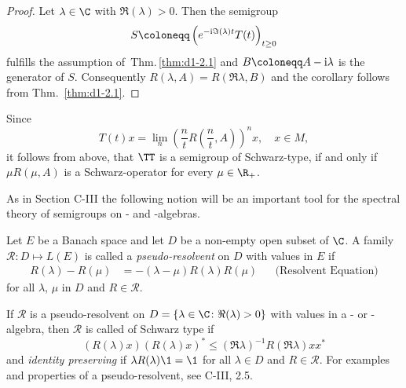 \begin{proof}
Let $ \lambda \in \C $ with $ \Re(\lambda) > 0 $.
Then the semigroup
\[
S \coloneqq \left(e^{- \I \Im (\lambda) t }T(t) \right)_{t \geq 0}
\]
fulfills the assumption of{\ }Thm.\,\ref{thm:d1-2.1} and $ B \coloneqq A - \I \lambda $ is the generator of $ S $.
Consequently $ R(\lambda,A) = R(\Re\lambda,B) $ and the corollary follows from Thm.~\ref{thm:d1-2.1}.
\end{proof}
\begin{remark}\label{rem:d1-2.3}
Since 
%
\[
	T(t)x = \lim_{n} \left( \frac{n}{t} R\left(\frac{n}{t}, A\right) \right)^{n} x , \quad x \in M , 
\]
%
it follows from above, that $ \TT $ is a semigroup of Schwarz-type, if and only if $ \mu R( \mu, A) $ is a Schwarz-operator for every $ \mu \in \R_{+} $.
\end{remark}
As in Section C-III the following notion will be an important tool for the spectral theory of semigroups on \CA- and \WA-algebras.
\begin{definition}\label{def:d1-2.4}
Let $E$ be a Banach space and let $D$ be a non-empty open subset of $\C$.
A family $ \mathcal{R} \colon D \mapsto L(E) $ is called a \emph{pseudo-resolvent} on $ D $ with values in $ E $ if
\begin{align*}
	R(\lambda) - R(\mu) &= -(\lambda - \mu)R(\lambda)R(\mu) &&\text{(Resolvent Equation)}
\end{align*}
for all $ \lambda $, $ \mu $ in $ D $ and $ R \in \mathcal{R} $.
\end{definition}
If $ \mathcal{R} $ is a {pseudo-resolvent} on $ D = \{\lambda \in \C \colon \Re(\lambda) > 0\} $ with values in a \CA- or \WA-algebra, then $ \mathcal{R} $ is called of Schwarz type if
\[
	(R(\lambda)x)(R(\lambda)x)^{*} \leq (\Re \lambda)^{-1} R(\Re\lambda)xx^{*}
\]
and \emph{identity preserving} if $ \lambda R(\lambda)\1 = \1 $ for all $ \lambda \in D $ and $ R \in \mathcal{R} $.
For examples and properties of a pseudo-resolvent, see C-III, 2.5.

